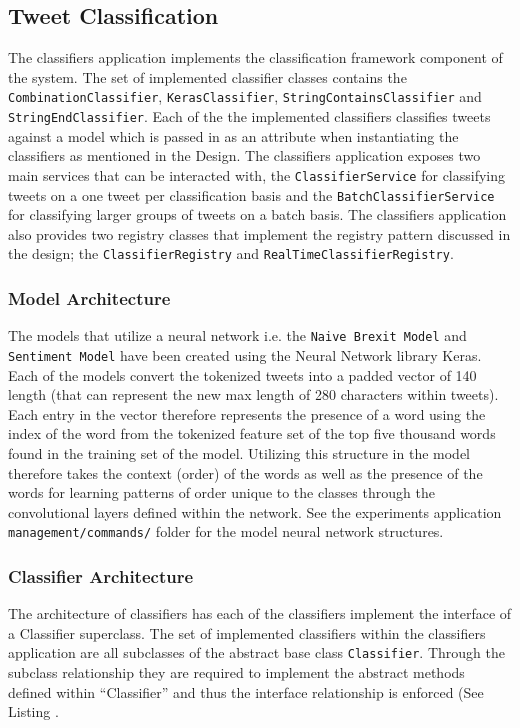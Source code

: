 \documentclass[11pt]{report}
\begin{document}
\subsection*{Tweet Classification}

The classifiers application implements the classification framework component of the system. The set of implemented classifier classes contains the  \texttt{CombinationClassifier}, \texttt{KerasClassifier}, \texttt{StringContainsClassifier} and \texttt{StringEndClassifier}. Each of the the implemented classifiers classifies tweets against a model which is passed in as an attribute when instantiating the classifiers as mentioned in the Design. The classifiers application exposes two main services that can be interacted with, the \texttt{ClassifierService} for classifying tweets on a one tweet per classification basis and the \texttt{BatchClassifierService} for classifying larger groups of tweets on a batch basis. The classifiers application also provides two registry classes that implement the registry pattern discussed in the design; the \texttt{ClassifierRegistry} and \texttt{RealTimeClassifierRegistry}.

\subsubsection*{Model Architecture}
The models that utilize a neural network i.e. the \texttt{Naive Brexit Model} and \texttt{Sentiment Model} have been created using the Neural Network library Keras. Each of the models convert the tokenized tweets into a padded vector of 140 length (that can represent the new max length of 280 characters within tweets). Each entry in the vector therefore represents the presence of a word using the index of the word from the tokenized feature set of the top five thousand words found in the training set of the model. Utilizing this structure in the model therefore takes the context (order) of the words as well as the presence of the words for learning patterns of order unique to the classes through the convolutional layers defined within the network. See the experiments application \texttt{management/commands/} folder for the model neural network structures.

\subsubsection*{Classifier Architecture}
The architecture of classifiers has each of the classifiers implement the interface of a Classifier superclass. The set of implemented classifiers within the classifiers application are all subclasses of the abstract base class \texttt{Classifier}. Through the subclass relationship they are required to implement the abstract methods defined within ``Classifier'' and thus the interface relationship is enforced (See Listing .
\end{document}
